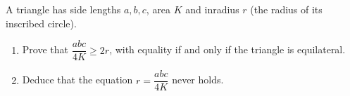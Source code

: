 A triangle has side lengths $a,b,c$, area $K$ and inradius $r$ (the radius of its inscribed circle).
\begin{enumerate}
\item[(a)] Prove that $\dfrac{abc}{4K}\ge2r$, with equality if and only if the triangle is equilateral.
\item[(b)] Deduce that the equation $r=\dfrac{abc}{4K}$ never holds.
\end{enumerate}
